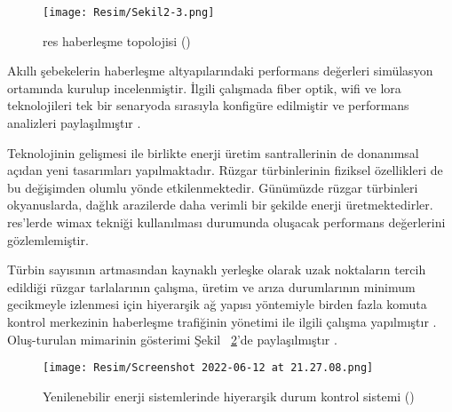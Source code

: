 \begin{figure}[htbp]
\centerline{\texttt{[image: Resim/Sekil2-3.png]}}
\caption{\gls{res} haberleşme topolojisi (\protect{}) }
\label{fig:figure4}
\end{figure}

Akıllı şebekelerin haberleşme altyapılarındaki performans değerleri simülasyon ortamında kurulup incelenmiştir. İlgili çalışmada fiber optik, \gls{wifi} ve \gls{lora} teknolojileri tek bir senaryoda sırasıyla konfigüre edilmiştir ve performans analizleri paylaşılmıştır \cite{yuan2020modeling}. 



Teknolojinin gelişmesi ile birlikte enerji üretim santrallerinin de donanımsal açıdan yeni tasarımları yapılmaktadır. Rüzgar türbinlerinin fiziksel özellikleri de bu değişimden olumlu yönde etkilenmektedir. Günümüzde rüzgar türbinleri okyanuslarda, dağlık arazilerde daha verimli bir şekilde enerji üretmektedirler. \cite{liu2010status} \gls{res}'lerde \gls{wimax} tekniği kullanılması durumunda oluşacak performans değerlerini gözlemlemiştir.




Türbin sayısının artmasından kaynaklı yerleşke olarak uzak noktaların tercih edildiği rüzgar tarlalarının çalışma, üretim ve arıza durumlarının minimum gecikmeyle izlenmesi için hiyerarşik ağ yapısı yöntemiyle birden fazla komuta kontrol merkezinin haberleşme trafiğinin yönetimi ile ilgili çalışma yapılmıştır \cite{hussain2014multilayer}. Oluş-turulan mimarinin gösterimi Şekil ~\ref{fig:figure6}'de paylaşılmıştır .






\begin{figure}[htbp]
\centerline{\texttt{[image: Resim/Screenshot 2022-06-12 at 21.27.08.png]}}
\caption{Yenilenebilir enerji sistemlerinde hiyerarşik durum kontrol sistemi (\protect{}) }
\label{fig:figure6}
\end{figure}
